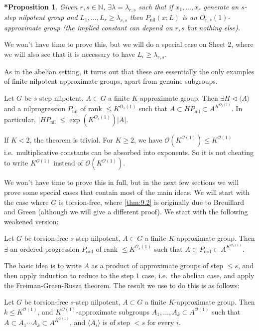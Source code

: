 \documentclass{article}
\newtheorem{nprop*}[nthm]{*Proposition}
\numberwithin{equation}{section}
\begin{document}
\begin{nprop*}
  Given $r,s \in \mathbb{N}$, $\exists \lambda = \lambda_{r,s}$ such that if $x_1, \dotsc, x_r$ generate an $s$-step nilpotent group and $L_1, \dotsc, L_r \geq \lambda_{r,s}$ then $P_{\text{nil}}(x;L)$ is an $O_{r,s}(1)$-approximate group (the implied constant can depend on $r,s$ but nothing else).
\end{nprop*}
We won't have time to prove this, but we will do a special case on Sheet 2, where we will also see that it is necessary to have $L_i \geq \lambda_{r,s}$.

As in the abelian setting, it turns out that these are essentially the only examples of finite nilpotent approximate groups, apart from genuine subgroups.

\begin{nthm}\label{thm:9.2}
  Let $G$ be $s$-step nilpotent, $A \subset G$ a finite $K$-approximate group.
  Then $\exists H \lhd \langle A \rangle$ and a nilprogression $P_{\text{nil}}$ of rank $\leq K^{O_s(1)}$ such that $A \subset H P_{\text{nil}} \subset A^{K^{O_s(1)}}$. In particular, $|HP_{\text{nil}}| \leq \exp(K^{O_s(1)})|A|$.
\end{nthm}

\begin{remark}
If $K < 2$, the theorem is trivial. For $K \geq 2$, we have $\mathcal{O}(K^{\mathcal{O}(1)}) \leq K^{\mathcal{O}(1)}$ i.e.\ multiplicative constants can be absorbed into exponents.
  So it is not cheating to write $K^{\mathcal{O}(1)}$ instead of $\mathcal{O}(K^{\mathcal{O}(1)})$.
\end{remark}
We won't have time to prove this in full, but in the next few sections we will prove some special cases that contain most of the main ideas.
We will start with the case where $G$ is torsion-free, where \cref{thm:9.2} is originally due to Breuillard and Green (although we will give a different proof).
We start with the following weakened version:
\begin{nthm}\label{thm:9.3}
  Let $G$ be torsion-free $s$-step nilpotent, $A \subset G$ a finite $K$-approximate group.
  Then $\exists$ an ordered progression $P_{\text{ord}}$ of rank $\leq K^{\mathcal{O}_s(1)}$ such that $A \subset P_{\text{ord}} \subset A^{K^{\mathcal{O}_s(1)}}$.
\end{nthm}

The basic idea is to write $A$ as a product of approximate groups of step $\leq s$, and then apply induction to reduce to the step $1$ case, i.e.\ the abelian case, and apply the Freiman-Green-Rusza theorem.
The result we use to do this is as follows:
\begin{nprop}\label{prop:9.4}
  Let $G$ be torsion-free $s$-step nilpotent, $A \subset G$ a finite $K$-approximate group.
  Then $k \leq K^{\mathcal{O}(1)}$, and $K^{\mathcal{O}(1)}$-approximate subgroups $A_1, \dotsc, A_k \subset A^{\mathcal{O}(1)}$ such that $A \subset A_1 \dotsm A_k \subset A^{K^{\mathcal{O}(1)}}$, and $\langle A_i \rangle$ is of step $< s$ for every $i$.
\end{nprop}
\end{document}
